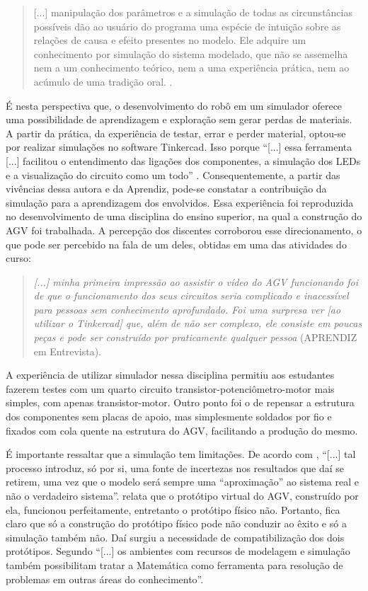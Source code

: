\documentclass[portuguese]{textolivre}
\begin{document}
\begin{quote}
[...] manipulação dos parâmetros e a simulação de todas as circunstâncias possíveis dão ao usuário do programa uma espécie de intuição sobre as relações de causa e efeito presentes no modelo. Ele adquire um conhecimento por simulação do sistema modelado, que não se assemelha nem a um conhecimento teórico, nem a uma experiência prática, nem ao acúmulo de uma tradição oral. \cite[p. 75]{Levy1993}.
\end{quote}

É nesta perspectiva que, o desenvolvimento do robô em um simulador oferece uma possibilidade de aprendizagem e exploração sem gerar perdas de materiais. A partir da prática, da experiência de testar, errar e perder material, optou-se por realizar simulações no software Tinkercad. Isso porque “[...] essa ferramenta [...] facilitou o entendimento das ligações dos componentes, a simulação dos LEDs e a visualização do circuito como um todo” \cite[p. 47-48]{AlvesMonica2022}. Consequentemente, a partir das vivências dessa autora e da Aprendiz, pode-se constatar a contribuição da simulação para a aprendizagem dos envolvidos. Essa experiência foi reproduzida no desenvolvimento de uma disciplina do ensino superior, na qual a construção do AGV foi trabalhada. A percepção dos discentes corroborou esse direcionamento, o que pode ser percebido na fala de um deles, obtidas em uma das atividades do curso:

\begin{quote}
\emph{[...] minha primeira impressão ao assistir o vídeo do AGV funcionando foi de que o funcionamento dos seus circuitos seria complicado e inacessível para pessoas sem conhecimento aprofundado. Foi uma surpresa ver [ao utilizar o Tinkercad] que, além de não ser complexo, ele consiste em poucas peças e pode ser construído por praticamente qualquer pessoa} (APRENDIZ em Entrevista).
\end{quote}

A experiência de utilizar simulador nessa disciplina permitiu aos estudantes fazerem testes com um quarto circuito transistor-potenciômetro-motor mais simples, com apenas transistor-motor. Outro ponto foi o de repensar a estrutura dos componentes sem placas de apoio, mas simplesmente soldados por fio e fixados com cola quente na estrutura do AGV, facilitando a produção do mesmo.

É importante ressaltar que a simulação tem limitações. De acordo com \textcite[p. 2]{BritoAntonio2001}, “[...] tal processo introduz, só por si, uma fonte de incertezas nos resultados que daí se retirem, uma vez que o modelo será sempre uma “aproximação” ao sistema real e não o verdadeiro sistema”. \textcite{AlvesMonica2022} relata que o protótipo virtual do AGV, construído por ela, funcionou perfeitamente, entretanto o protótipo físico não. Portanto, fica claro que só a construção do protótipo físico pode não conduzir ao êxito e só a simulação também não. Daí surgiu a necessidade de compatibilização dos dois protótipos. Segundo \textcite[p. 80]{Gravinha1999} “[...] os ambientes com recursos de modelagem e simulação também possibilitam tratar a Matemática como ferramenta para resolução de problemas em outras áreas do conhecimento”.
\end{document}

